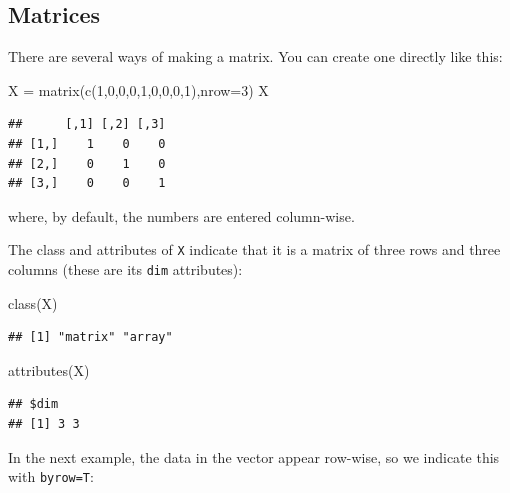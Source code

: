 \documentclass[
]{book}
\newenvironment{Shaded}{\begin{snugshade}}{\end{snugshade}}
\newcommand{\AttributeTok}[1]{\textcolor[rgb]{0.77,0.63,0.00}{#1}}
\newcommand{\DecValTok}[1]{\textcolor[rgb]{0.00,0.00,0.81}{#1}}
\newcommand{\FunctionTok}[1]{\textcolor[rgb]{0.00,0.00,0.00}{#1}}
\newcommand{\NormalTok}[1]{#1}
\newcommand{\OtherTok}[1]{\textcolor[rgb]{0.56,0.35,0.01}{#1}}
\begin{document}
\hypertarget{matrices}{%
\subsection{Matrices}\label{matrices}}

There are several ways of making a matrix. You can create one directly like this:

\begin{Shaded}
\begin{Highlighting}[]
\NormalTok{X }\OtherTok{=} \FunctionTok{matrix}\NormalTok{(}\FunctionTok{c}\NormalTok{(}\DecValTok{1}\NormalTok{,}\DecValTok{0}\NormalTok{,}\DecValTok{0}\NormalTok{,}\DecValTok{0}\NormalTok{,}\DecValTok{1}\NormalTok{,}\DecValTok{0}\NormalTok{,}\DecValTok{0}\NormalTok{,}\DecValTok{0}\NormalTok{,}\DecValTok{1}\NormalTok{),}\AttributeTok{nrow=}\DecValTok{3}\NormalTok{)}
\NormalTok{X}
\end{Highlighting}
\end{Shaded}

\begin{verbatim}
##      [,1] [,2] [,3]
## [1,]    1    0    0
## [2,]    0    1    0
## [3,]    0    0    1
\end{verbatim}

where, by default, the numbers are entered column-wise.

The class and attributes of \texttt{X} indicate that it is a matrix of three rows and three columns (these are its \texttt{dim} attributes):

\begin{Shaded}
\begin{Highlighting}[]
\FunctionTok{class}\NormalTok{(X)}
\end{Highlighting}
\end{Shaded}

\begin{verbatim}
## [1] "matrix" "array"
\end{verbatim}

\begin{Shaded}
\begin{Highlighting}[]
\FunctionTok{attributes}\NormalTok{(X)}
\end{Highlighting}
\end{Shaded}

\begin{verbatim}
## $dim
## [1] 3 3
\end{verbatim}

In the next example, the data in the vector appear row-wise, so we indicate this with \texttt{byrow=T}:
\end{document}

